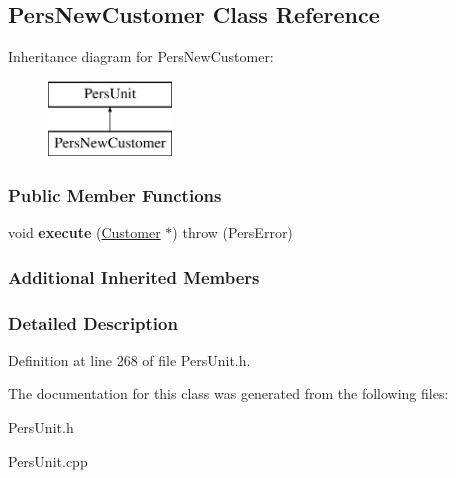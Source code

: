 \hypertarget{classPersNewCustomer}{\subsection{Pers\-New\-Customer Class Reference}
\label{d2/df7/classPersNewCustomer}
}
Inheritance diagram for Pers\-New\-Customer\-:\begin{figure}[H]
\begin{center}
\leavevmode
\includegraphics[height=2.000000cm]{d2/df7/classPersNewCustomer}
\end{center}
\end{figure}
\subsubsection*{Public Member Functions}
\begin{DoxyCompactItemize}
\item 
\hypertarget{classPersNewCustomer_ad51534c9c036e6eb8b9294242d5631ea}{void {\bfseries execute} (\hyperlink{classCustomer}{Customer} $\ast$)  throw (\-Pers\-Error)}\label{d2/df7/classPersNewCustomer_ad51534c9c036e6eb8b9294242d5631ea}

\end{DoxyCompactItemize}
\subsubsection*{Additional Inherited Members}


\subsubsection{Detailed Description}


Definition at line 268 of file Pers\-Unit.\-h.



The documentation for this class was generated from the following files\-:\begin{DoxyCompactItemize}
\item 
Pers\-Unit.\-h\item 
Pers\-Unit.\-cpp\end{DoxyCompactItemize}
